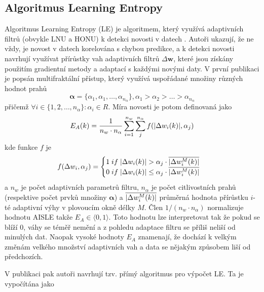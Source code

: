 \subsection{Algoritmus Learning Entropy}\label{chap:LE}
Algoritmus Learning Entropy (LE) je algoritmem, který využívá adaptivních filtrů (obvykle LNU a HONU) k detekci novosti v datech \cite{ivoLE1,ivoLE2}. Autoři ukazují, že ne vždy, je novost v datech korelována s chybou predikce, a k detekci novosti navrhují využívat přírůstky vah adaptivních filtrů $\Delta\textbf{w}$, které jsou získány použitím gradientní metody a adaptací s každými novými daty. V první publikaci \cite{ivoLE1} je popsán multifraktální přístup, který využívá uspořádané množiny různých hodnot prahů
\begin{equation}
\boldsymbol{\alpha}=\{ \alpha_1,\alpha_1,\dots,\alpha_{n_{\alpha}} \}, \alpha_1>\alpha_2>\dots>\alpha_{n_{\alpha}}
\end{equation}
přičemž $\forall i \in \{1,2,\dots,n_{\alpha} \}:\alpha_i\in R$. Míra novosti  je potom definovaná jako
\begin{equation}\label{eq:aisle}
E_A(k)=\frac{1}{n_w\cdot n_{\alpha}}\sum_{i=1}^{n_w}\sum_j^{n_{\alpha}} f(\lvert\Delta w_i(k)\rvert, \alpha_j)
\end{equation}
kde funkce $f$ je
\begin{equation}
f(\Delta w_i, \alpha_j)=\begin{cases}
1 \; if \; \lvert\Delta w_i(k)\rvert>\alpha_{j} \cdot \overline{\lvert\Delta w_i^M(k)\rvert}\\
0 \; if \; \lvert\Delta w_i(k)\rvert\leq \alpha_j \cdot \overline{\lvert\Delta w_i^M(k)\rvert}


\end{cases}
\end{equation}
a $n_w$ je počet adaptivních parametrů filtru, $n_{\alpha}$ je počet citlivostních prahů (respektive počet prvků množiny $\boldsymbol{\alpha}$) a $\overline{\lvert\Delta w_i^M(k)\rvert}$ průměrná hodnota přírůstku $i$-té adaptivní výhy v plovoucím okně délky $M$. Člen $1/(n_w\cdot n_{\alpha})$ normalizuje hodnotu AISLE takže  $E_A \in \langle 0,1\rangle$. Toto hodnotu lze interpretovat tak že pokud se blíží 0, váhy se téměř nemění a z pohledu adaptace filtru se příliš neliší od minulých dat. Naopak vysoké hodnoty $E_A$ znamenají, že dochází k velkým změnám velkého množství adaptivních vah a data se nějakým způsobem liší od předchozích. 
\par
V publikaci \cite{ivoLE2} pak autoři navrhují tzv. přímý algoritmus pro výpočet LE. Ta je vypočítána jako
